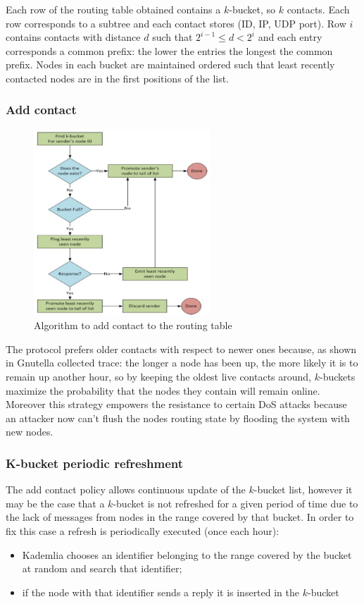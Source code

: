 Each row of the routing table obtained contains a $k$-bucket, so $k$ contacts.
Each row corresponds to a subtree and each contact stores (ID, IP, UDP port).
Row $i$ contains contacts with distance $d$ such that $2^{i-1} \leq d < 2^i$ and each entry corresponds a common prefix: the lower the entries the longest the common prefix.
Nodes in each bucket are maintained ordered such that least recently contacted nodes are in the first positions of the list.

\subsubsection{Add contact}
\begin{figure}[H]
    \centering
    \includegraphics[width=250px]{images/3_DHT/04.png}
    \caption{Algorithm to add contact to the routing table}
\end{figure}

The protocol prefers older contacts with respect to newer ones because, as shown in Gnutella collected trace: the longer a node has been up, the more likely it is to remain up another hour, so by keeping the oldest live contacts around, $k$-buckets maximize the probability that the nodes they contain will remain online.
Moreover this strategy empowers the resistance to certain DoS attacks because an attacker now can't flush the nodes routing state by flooding the system with new nodes.

\subsubsection{K-bucket periodic refreshment}
The add contact policy allows continuous update of the $k$-bucket list, however it may be the case that a $k$-bucket is not refreshed for a given period of time due to the lack of messages from nodes in the range covered by that bucket.
In order to fix this case a refresh is periodically executed (once each hour):
\begin{itemize}
    \item Kademlia chooses an identifier belonging to the range covered by the bucket at random and search that identifier;
    \item if the node with that identifier sends a reply it is inserted in the $k$-bucket
\end{itemize}

